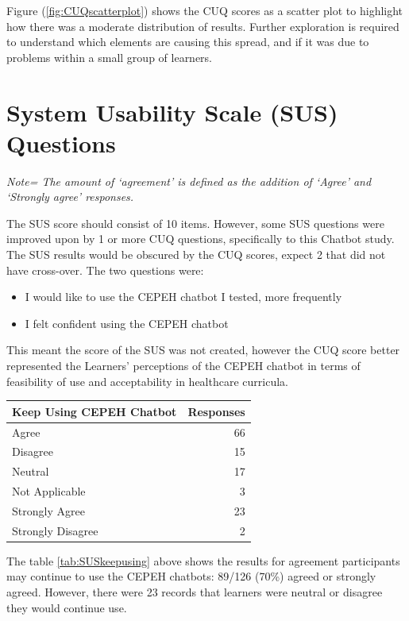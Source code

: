 \documentclass[a4paper, nobind]{templates/ociamthesis}
\begin{document}
Figure (\ref{fig:CUQscatterplot}) shows the CUQ scores as a scatter plot to highlight how there was a moderate distribution of results.
Further exploration is required to understand which elements are causing this spread, and if it was due to problems within a small group of learners.

\hypertarget{system-usability-scale-sus-questions}{%
\section{System Usability Scale (SUS) Questions}\label{system-usability-scale-sus-questions}}

\emph{Note= The amount of `agreement' is defined as the addition of `Agree'
and `Strongly agree' responses.}

The SUS score should consist of 10 items. However, some SUS questions were improved upon by 1 or more CUQ questions, specifically to this Chatbot study. The SUS results would be obscured by the CUQ scores, expect 2 that did not have cross-over. The two questions were:

\begin{itemize}
\item
  I would like to use the CEPEH chatbot I tested, more frequently
\item
  I felt confident using the CEPEH chatbot
\end{itemize}

This meant the score of the SUS was not created, however the CUQ score better represented the Learners' perceptions of the CEPEH chatbot in terms of feasibility of use and acceptability in healthcare curricula.

\begin{longtable}[]{@{}lr@{}}
\toprule()
Keep Using CEPEH Chatbot & Responses \\
\midrule()
\endhead
Agree & 66 \\
Disagree & 15 \\
Neutral & 17 \\
Not Applicable & 3 \\
Strongly Agree & 23 \\
Strongly Disagree & 2 \\
\bottomrule()
\end{longtable}

The table \ref{tab:SUSkeepusing} above shows the results for agreement participants may
continue to use the CEPEH chatbots: 89/126 (70\%) agreed or strongly agreed. However, there were 23 records that learners were neutral or disagree they would continue use.
\end{document}

